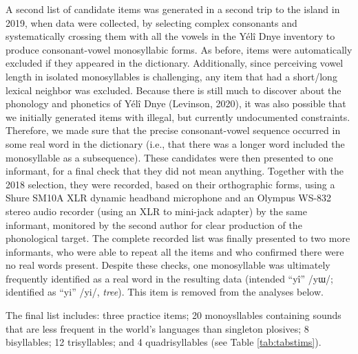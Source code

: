 \documentclass[english,,man,floatsintext]{apa6}
\begin{document}
A second list of candidate items was generated in a second trip to the island in 2019, when data were collected, by selecting complex consonants and systematically crossing them with all the vowels in the Yélî Dnye inventory to produce consonant-vowel monosyllabic forms. As before, items were automatically excluded if they appeared in the dictionary. Additionally, since perceiving vowel length in isolated monosyllables is challenging, any item that had a short/long lexical neighbor was excluded. Because there is still much to discover about the phonology and phonetics of Yélî Dnye (Levinson, 2020), it was also possible that we initially generated items with illegal, but currently undocumented constraints. Therefore, we made sure that the precise consonant-vowel sequence occurred in some real word in the dictionary (i.e., that there was a longer word included the monosyllable as a subsequence). These candidates were then presented to one informant, for a final check that they did not mean anything. Together with the 2018 selection, they were recorded, based on their orthographic forms, using a Shure SM10A XLR dynamic headband microphone and an Olympus WS-832 stereo audio recorder (using an XLR to mini-jack adapter) by the same informant, monitored by the second author for clear production of the phonological target. The complete recorded list was finally presented to two more informants, who were able to repeat all the items and who confirmed there were no real words present. Despite these checks, one monosyllable was ultimately frequently identified as a real word in the resulting data (intended \enquote{yî} /yɯ/; identified as \enquote{yi} /yi/, \emph{tree}). This item is removed from the analyses below.

The final list includes: three practice items; 20 monoysllables containing sounds that are less frequent in the world's languages than singleton plosives; 8 bisyllables; 12 trisyllables; and 4 quadrisyllables (see Table \ref{tab:tabstims}).
\end{document}
